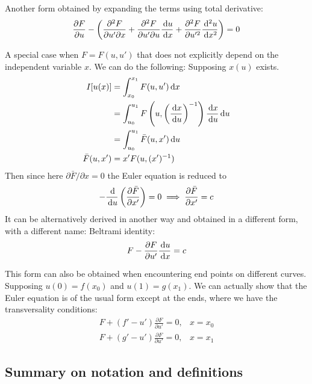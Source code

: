 \documentclass{article}
\begin{document}
\begin{proposition}
    Another form obtained by expanding the terms using total derivative:
    \[\frac{\partial F}{\partial u} - \left( \frac{\partial ^2 F}{\partial u'\partial x}+\frac{\partial ^2 F}{\partial u'\partial u}\frac{\,\mathrm{d} u}{\,\mathrm{d} x}+\frac{\partial ^2 F}{\partial u'^2 }\frac{\,\mathrm{d}^2u}{\,\mathrm{d} x^2} \right)=0\]
\end{proposition}

\begin{corollary}
    A special case when \(F=F(u,u')\) that does not explicitly depend on the independent variable \(x\). We can do the following: Supposing \(x(u)\) exists.
    \begin{align*}
        I[u(x)] &= \int_{x_0}^{x_1} F(u,u') \,\mathrm{d} x\\
        &= \int_{u_0}^{u_1} F\left( u, \left( \frac{\,\mathrm{d} x}{\,\mathrm{d} u} \right)^{-1} \right)\frac{\,\mathrm{d} x}{\,\mathrm{d} u}\,\mathrm{d} u\\
        &= \int_{u_0}^{u_1}  \bar F(u,x')\,\mathrm{d} u\\
        \bar F(u,x') &= x'F(u,(x')^{-1})
    \end{align*}
    Then since here \(\partial \bar F/\partial x=0\) the Euler equation is reduced to 
    \[-\frac{\,\mathrm{d} }{\,\mathrm{d} u}\left( \frac{\partial \bar F}{\partial x'} \right)=0\implies \frac{\partial \bar F}{\partial x'}=c\]
    It can be alternatively derived in another way and obtained in a different form, with a different name: Beltrami identity:
    \[F-\frac{\partial F}{\partial u'}\frac{\,\mathrm{d} u}{\,\mathrm{d} x}=c\]
\end{corollary}

\begin{corollary}
    This form can also be obtained when encountering end points on different curves. Supposing \(u(0)=f(x_0)\) and \(u(1)=g(x_1)\). We can actually show that the Euler equation is of the usual form except at the ends, where we have the transversality conditions:
    \begin{align*}
        F+(f'-u')\frac{\partial F}{\partial u'}=0, &x=x_0\\
        F+(g'-u')\frac{\partial F}{\partial u'}=0, &x=x_1
    \end{align*}
\end{corollary}

\subsection{Summary on notation and definitions}
\end{document}
